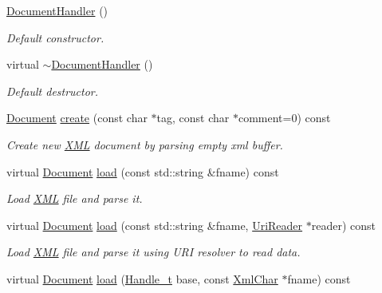 \begin{DoxyCompactItemize}
\item 
\hyperlink{class_d_d4hep_1_1_x_m_l_1_1_document_handler_ac24bb98e06d7db2b0823816eec2f6c19}{Document\+Handler} ()
\begin{DoxyCompactList}\small\item\em Default constructor. \end{DoxyCompactList}\item 
virtual \hyperlink{class_d_d4hep_1_1_x_m_l_1_1_document_handler_ac4952ef609acf7234615d2db783ca5fa}{$\sim$\+Document\+Handler} ()
\begin{DoxyCompactList}\small\item\em Default destructor. \end{DoxyCompactList}\item 
\hyperlink{class_d_d4hep_1_1_x_m_l_1_1_document}{Document} \hyperlink{class_d_d4hep_1_1_x_m_l_1_1_document_handler_ae45dceae6f7dd6e2cd90978ee24807c6}{create} (const char $\ast$tag, const char $\ast$comment=0) const
\begin{DoxyCompactList}\small\item\em Create new \hyperlink{namespace_d_d4hep_1_1_x_m_l}{X\+ML} document by parsing empty xml buffer. \end{DoxyCompactList}\item 
virtual \hyperlink{class_d_d4hep_1_1_x_m_l_1_1_document}{Document} \hyperlink{class_d_d4hep_1_1_x_m_l_1_1_document_handler_a092d3cb14789753a796db6356b792830}{load} (const std\+::string \&fname) const
\begin{DoxyCompactList}\small\item\em Load \hyperlink{namespace_d_d4hep_1_1_x_m_l}{X\+ML} file and parse it. \end{DoxyCompactList}\item 
virtual \hyperlink{class_d_d4hep_1_1_x_m_l_1_1_document}{Document} \hyperlink{class_d_d4hep_1_1_x_m_l_1_1_document_handler_a6e0d564d1f31a18f66746799f4df4eac}{load} (const std\+::string \&fname, \hyperlink{class_d_d4hep_1_1_x_m_l_1_1_uri_reader}{Uri\+Reader} $\ast$reader) const
\begin{DoxyCompactList}\small\item\em Load \hyperlink{namespace_d_d4hep_1_1_x_m_l}{X\+ML} file and parse it using U\+RI resolver to read data. \end{DoxyCompactList}\item 
virtual \hyperlink{class_d_d4hep_1_1_x_m_l_1_1_document}{Document} \hyperlink{class_d_d4hep_1_1_x_m_l_1_1_document_handler_a97b514603d47fc3e6e2e50f5fb9396c5}{load} (\hyperlink{class_d_d4hep_1_1_x_m_l_1_1_handle__t}{Handle\+\_\+t} base, const \hyperlink{namespace_d_d4hep_1_1_x_m_l_a09e5d9cc86ed782f6826dfe0778c1815}{Xml\+Char} $\ast$fname) const

\end{DoxyCompactItemize}

